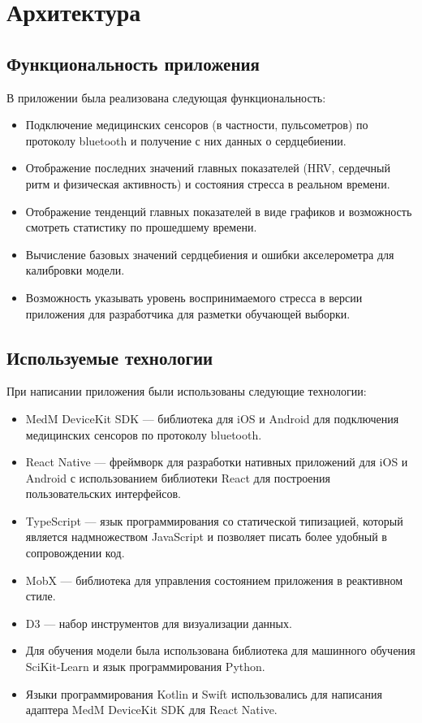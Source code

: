 \documentclass[14pt]{matmex-diploma-custom}
\begin{document}
\section{Архитектура}
\subsection{Функциональность приложения}
В приложении была реализована следующая функциональность:
\begin{itemize}
\item Подключение медицинских сенсоров (в частности, пульсометров) по протоколу
  bluetooth и получение с них данных о сердцебиении.
\item Отображение последних значений главных показателей (HRV, сердечный ритм и
  физическая активность) и состояния стресса в реальном времени.
\item Отображение тенденций главных показателей в виде графиков и возможность
  смотреть статистику по прошедшему времени.
\item Вычисление базовых значений сердцебиения и ошибки акселерометра для калибровки модели.
\item Возможность указывать уровень воспринимаемого стресса в версии приложения
  для разработчика для разметки обучающей выборки.
\end{itemize}

\subsection{Используемые технологии}
При написании приложения были использованы следующие технологии:
\begin{itemize}
\item MedM DeviceKit SDK --- библиотека для iOS и Android для подключения
  медицинских сенсоров по протоколу bluetooth.
\item React Native --- фреймворк для разработки нативных приложений для iOS и
  Android с использованием библиотеки React для построения пользовательских
  интерфейсов.
\item TypeScript --- язык программирования со статической типизацией, который
  является надмножеством JavaScript и позволяет писать более удобный в
  сопровождении код.
\item MobX --- библиотека для управления состоянием приложения в реактивном
  стиле.
\item D3 --- набор инструментов для визуализации данных.
\item Для обучения модели была использована библиотека для машинного обучения
  SciKit-Learn и язык программирования Python.
\item Языки программирования Kotlin и Swift использовались для написания
  адаптера MedM DeviceKit SDK для React Native.
\end{itemize}
\end{document}
